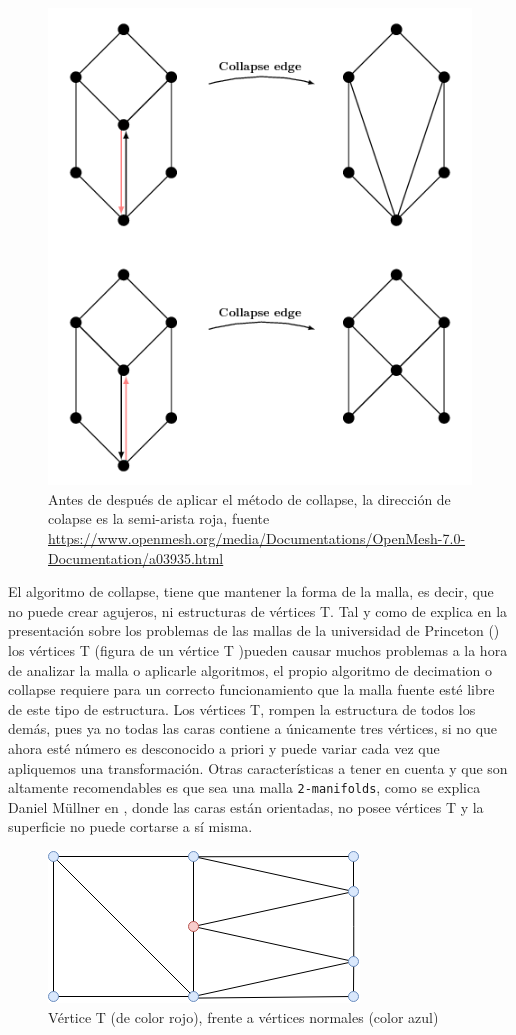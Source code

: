 \begin{figure} %
	\centering
	\includegraphics[scale=0.8]{imagenes/meshcollapse.png} 
	\caption{Antes de después de aplicar el método de collapse, la dirección de colapse es la semi-arista roja, fuente \url{https://www.openmesh.org/media/Documentations/OpenMesh-7.0-Documentation/a03935.html}} \label{fig:meshcollapse.png}
\end{figure}

El algoritmo de collapse, tiene que mantener la forma de la malla, es decir, que no puede crear agujeros, ni estructuras de vértices T. Tal y como de explica en la presentación sobre los problemas de las mallas de la universidad de Princeton (\cite{FrequentMeshProblems}) los vértices T (figura de un vértice T )pueden causar muchos problemas a la hora de analizar la malla o aplicarle algoritmos, el propio algoritmo de decimation o collapse requiere para un correcto funcionamiento que la malla fuente esté libre de este tipo de estructura. Los vértices T, rompen la estructura de todos los demás, pues ya no todas las caras contiene a únicamente tres vértices, si no que ahora esté número es desconocido a priori y puede variar cada vez que apliquemos una transformación. Otras características a tener en cuenta y que son altamente recomendables es que sea una malla \texttt{2-manifolds}, como se explica Daniel Müllner en  \cite{2manifoldsManifoldAtlas}, donde las caras están orientadas, no posee vértices T y la superficie no puede cortarse a sí misma. 	

\begin{figure} %
	\centering
	\includegraphics[scale=0.8]{imagenes/T_vertice.png} 
	\caption{Vértice T (de color rojo), frente a vértices normales (color azul)} \label{fig:T_vertice.png}
\end{figure}